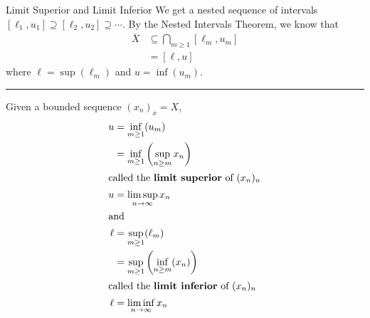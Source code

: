 \documentclass[10pt]{extarticle}
\begin{document}
\begin{problem}{Limit Superior and Limit Inferior}
    We get a nested sequence of intervals $[\ell_1,u_1]\supseteq [\ell_2,u_2]\supseteq \cdots$. By the Nested Intervals Theorem, we know that
    \begin{align*}
      \overline{X} &\subseteq \bigcap_{m\geq 1}[\ell_m,u_m]\\
                   &= [\ell,u]
    \end{align*}
    where $\ell = \sup(\ell_m)$ and $u = \inf(u_m)$.\\
    \vspace{4pt}
    \rule{\textwidth}{0.4pt}
    \vspace{4pt}
    Given a bounded sequence $(x_n)_x = X$,
    \begin{align*}
      u &= \inf_{m\geq 1}(u_m)\\
        &= \inf_{m\geq 1}\left(\sup_{n\geq m}x_n\right)\\
        \shortintertext{called the \textbf{limit superior} of $(x_n)_n$}
      u &= \limsup_{n\rightarrow\infty}x_n\\
      \shortintertext{and}
      \ell &= \sup_{m\geq 1}(\ell_m)\\
           &= \sup_{m\geq 1}\left(\inf_{n\geq m}(x_n)\right)\\
           \shortintertext{called the \textbf{limit inferior} of $(x_n)_n$}
      \ell &= \liminf_{n\rightarrow\infty}x_n
    \end{align*}
  \end{problem}
\end{document}
